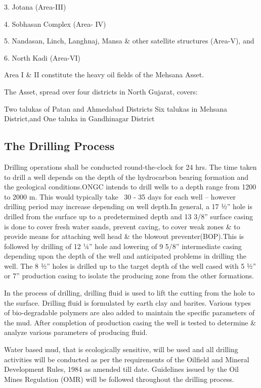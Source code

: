 \documentclass[11pt,a4paper]{article}
\begin{document}
3. Jotana (Area-III)

4. Sobhasan Complex (Area- IV)

5. Nandasan, Linch, Langhnaj, Mansa \& other satellite structures (Area-V), and

6. North Kadi (Area-VI)

Area I \& II constitute the heavy oil fields of the Mehsana Asset.

The Asset, spread over four districts in North Gujarat, covers:

Two talukas of Patan and Ahmedabad Districts Six talukas in Mehsana District,and One taluka in Gandhinagar District

\subsection{\textbf{The Drilling Process}}

Drilling operations shall be conducted round-the-clock for 24 hrs. The time taken to drill a well depends on the depth of the hydrocarbon bearing formation and the geological conditions.ONGC intends to drill wells to a depth range from 1200 to 2000 m. This would typically take ~30 - 35 days for each well – however drilling period may increase depending on well depth.In general, a 17 1⁄2” hole is drilled from the surface up to a predetermined depth and 13 3/8” surface casing is done to cover fresh water sands, prevent caving, to cover weak zones \& to provide means for attaching well head \& the blowout preventer(BOP).This is followed by drilling of 12 1⁄4” hole and lowering of 9 5/8” intermediate casing depending upon the depth of the well and anticipated problems in drilling the well. The 8 1⁄2” holes is drilled up to the target depth of the well cased with 5 1⁄2” or 7” production casing to isolate the producing zone from the other formations.

In the process of drilling, drilling fluid is used to lift the cutting from the hole to the surface. Drilling fluid is formulated by earth clay and barites. Various types of bio-degradable polymers are also added to maintain the specific parameters of the mud. After completion of production casing the well is tested to determine \& analyze various parameters of producing fluid.

Water based mud, that is ecologically sensitive, will be used and all drilling activities will be conducted as per the requirements of the Oilfield and Mineral Development Rules, 1984 as amended till date. Guidelines issued by the Oil Mines Regulation (OMR) will be followed throughout the drilling process.
\end{document}

